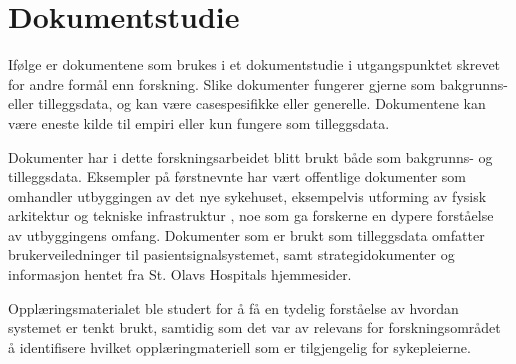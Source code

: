 \section{Dokumentstudie}
\label{sec:dokumentstudie}
Ifølge \citet{Tjora} er dokumentene som brukes i et dokumentstudie i utgangspunktet skrevet for andre formål enn forskning. Slike dokumenter fungerer gjerne som bakgrunns- eller tilleggsdata, og kan være casespesifikke eller generelle. Dokumentene kan være eneste kilde til empiri eller kun fungere som tilleggsdata. 

\noindent
Dokumenter har i dette forskningsarbeidet blitt brukt både som bakgrunns- og tilleggsdata. Eksempler på førstnevnte har vært offentlige dokumenter som omhandler utbyggingen av det nye sykehuset, eksempelvis utforming av fysisk arkitektur \citep{Aslaksen, Sintef-sengetun} og tekniske infrastruktur \citep{TU}, noe som ga forskerne en dypere forståelse av utbyggingens omfang. Dokumenter som er brukt som tilleggsdata omfatter brukerveiledninger til pasientsignalsystemet, samt strategidokumenter og informasjon hentet fra St. Olavs Hospitals hjemmesider. 

\noindent
Opplæringsmaterialet ble studert for å få en tydelig forståelse av hvordan systemet er tenkt brukt, samtidig som det var av relevans for forskningsområdet å identifisere hvilket opplæringmateriell som er tilgjengelig for sykepleierne.